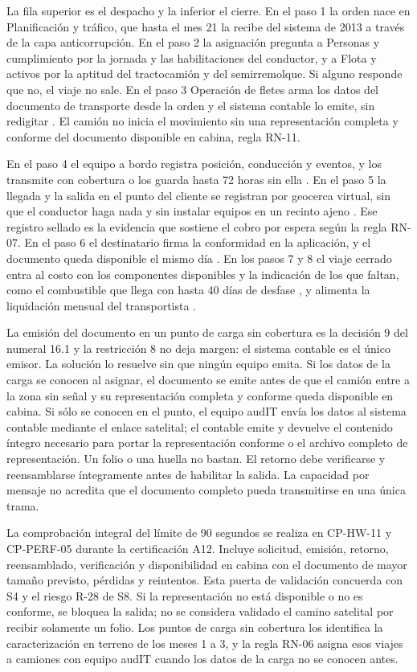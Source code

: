 La fila superior es el despacho y la inferior el cierre. En el paso 1 la orden nace en Planificación y
tráfico, que hasta el mes 21 la recibe del sistema de 2013 a través de la capa anticorrupción. En el paso
2 la asignación pregunta a Personas y cumplimiento por la jornada y las habilitaciones del conductor, y a
Flota y activos por la aptitud del tractocamión y del semirremolque. Si alguno responde que no, el viaje
no sale. En el paso 3 Operación de fletes arma los datos del documento de transporte desde la orden y el
sistema contable lo emite, sin redigitar . El camión no inicia el movimiento sin una
representación completa y conforme del documento disponible en cabina, regla RN-11.

En el paso 4 el equipo a bordo registra posición, conducción y eventos, y los transmite con cobertura o
los guarda hasta 72 horas sin ella . En el paso 5 la llegada y la salida en el punto del
cliente se registran por geocerca virtual, sin que el conductor haga nada y sin instalar equipos en un
recinto ajeno . Ese registro sellado es la evidencia que sostiene el cobro por espera según
la regla RN-07. En el paso 6 el destinatario firma la conformidad en la aplicación, y el documento queda
disponible el mismo día . En los pasos 7 y 8 el viaje cerrado entra al costo con los
componentes disponibles y la indicación de los que faltan, como el combustible que llega con hasta 40 días
de desfase , y alimenta la liquidación mensual del transportista .

La emisión del documento en un punto de carga sin cobertura es la decisión 9 del numeral 16.1 y la
restricción 8 no deja margen: el sistema contable es el único emisor. La solución lo resuelve sin que
ningún equipo emita. Si los datos de la carga se conocen al asignar, el documento se emite antes de que
el camión entre a la zona sin señal y su representación completa y conforme queda disponible en cabina.
Si sólo se conocen en el punto, el equipo audIT envía los datos al sistema contable mediante el enlace
satelital; el contable emite y devuelve el contenido íntegro necesario para portar la representación
conforme o el archivo completo de representación. Un folio o una huella no bastan. El retorno debe
verificarse y reensamblarse íntegramente antes de habilitar la salida. La capacidad por mensaje no
acredita que el documento completo pueda transmitirse en una única trama.

La comprobación integral del límite de 90 segundos se realiza en CP-HW-11 y CP-PERF-05
durante la certificación A12. Incluye solicitud, emisión, retorno, reensamblado,
verificación y disponibilidad en cabina con el documento de mayor tamaño previsto,
pérdidas y reintentos. Esta puerta de validación concuerda con S4 y el riesgo R-28 de S8.
Si la representación no está disponible o no es conforme, se bloquea la salida; no se considera
validado el camino satelital por recibir solamente un folio. Los
puntos de carga sin cobertura los identifica la caracterización en terreno de los meses 1 a 3, y la regla
RN-06 asigna esos viajes a camiones con equipo audIT cuando los datos de la carga no se conocen antes.

